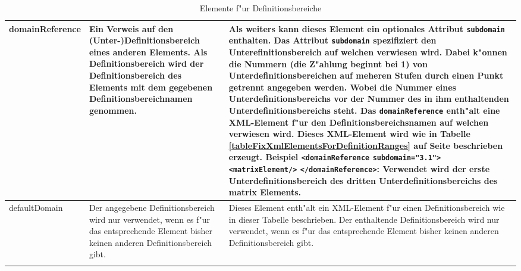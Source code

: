 \begin{center}
\begin{longtable}{|p{25mm}|p{25mm}|p{75mm}|}
	domainReference & Ein Verweis auf den (Unter-)Definitionsbereich eines anderen Elements. Als Definitionsbereich wird der Definitionsbereich des Elements mit dem gegebenen Definitions\-bereich\-namen genommen. & 
	Als weiters kann dieses Element ein optionales Attribut \verb|subdomain| enthalten. Das Attribut \verb|subdomain| spezifiziert den Unterefinitionsbereich auf welchen verwiesen wird. Dabei k"onnen die Nummern (die Z"ahlung beginnt bei 1) von Unterdefinitionsbereichen auf meheren Stufen durch einen Punkt getrennt angegeben werden. Wobei die Nummer eines Unterdefinitionsbereichs vor der Nummer des in ihm enthaltenden Unterdefinitionsbereichs steht. Das \verb|domainReference| enth"alt eine XML-Element f"ur den Definitions\-bereichs\-namen auf welchen verwiesen wird. Dieses XML-Element wird wie in Tabelle \ref{tableFixXmlElementsForDefinitionRanges} auf Seite \pageref{tableFixXmlElementsForDefinitionRanges} beschrieben erzeugt. Beispiel \verb|<domainReference| \verb|subdomain="3.1">| \verb|<matrixElement/>| \verb|</domainReference>|: Verwendet wird der erste Unterdefinitionsbereich des dritten Unterdefinitionsbereichs des matrix Elements.\\\hline

	defaultDomain & Der angegebene Definitionsbereich wird nur verwendet, wenn es f"ur das entsprechende Element bisher keinen anderen Definitionsbereich gibt. & Dieses Element enth"alt ein XML-Element f"ur einen Definitionsbereich wie in dieser Tabelle beschrieben. Der enthaltende Definitionsbereich wird nur verwendet, wenn es f"ur das entsprechende Element bisher keinen anderen Definitionsbereich gibt. \\\hline

\caption{Elemente f"ur Definitionsbereiche}
\label{tableXmlDefinitionRanges}
\end{longtable}
\end{center}


